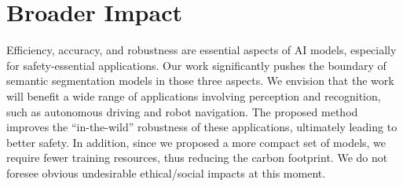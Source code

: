 \section*{Broader Impact} \label{sec:impact}
Efficiency, accuracy, and robustness are essential aspects of AI models, especially for safety-essential applications. Our work significantly pushes the boundary of semantic segmentation models in those three aspects. We envision that the work will benefit a wide range of applications involving perception and recognition, such as autonomous driving and robot navigation. The proposed method improves the ``in-the-wild'' robustness of these applications, ultimately leading to better safety. In addition, since we proposed a more compact set of models, we require fewer training resources, thus reducing the carbon footprint. We do not foresee obvious undesirable ethical/social impacts at this moment.
